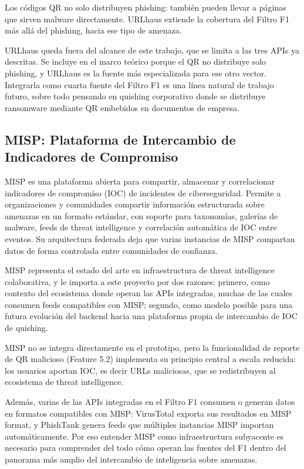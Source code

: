 Los c\'odigos QR no solo distribuyen phishing: tambi\'en pueden llevar a p\'aginas que sirven malware directamente. URLhaus extiende la cobertura del Filtro F1 m\'as all\'a del phishing, hacia ese tipo de amenaza.

URLhaus queda fuera del alcance de este trabajo, que se limita a las tres APIs ya descritas. Se incluye en el marco te\'orico porque el QR no distribuye solo phishing, y URLhaus es la fuente m\'as especializada para ese otro vector. Integrarla como cuarta fuente del Filtro F1 es una l\'inea natural de trabajo futuro, sobre todo pensando en quishing corporativo donde se distribuye ransomware mediante QR embebidos en documentos de empresa.

\subsection{MISP: Plataforma de Intercambio de Indicadores de Compromiso}

MISP \cite{misp_project} es una plataforma abierta para compartir, almacenar y correlacionar indicadores de compromiso (IOC) de incidentes de ciberseguridad. Permite a organizaciones y comunidades compartir informaci\'on estructurada sobre amenazas en un formato est\'andar, con soporte para taxonom\'ias, galer\'ias de malware, feeds de threat intelligence y correlaci\'on autom\'atica de IOC entre eventos. Su arquitectura federada deja que varias instancias de MISP compartan datos de forma controlada entre comunidades de confianza.

MISP representa el estado del arte en infraestructura de threat intelligence colaborativa, y le importa a este proyecto por dos razones: primero, como contexto del ecosistema donde operan las APIs integradas, muchas de las cuales consumen feeds compatibles con MISP; segundo, como modelo posible para una futura evoluci\'on del backend hacia una plataforma propia de intercambio de IOC de quishing.

MISP no se integra directamente en el prototipo, pero la funcionalidad de reporte de QR malicioso (Feature 5.2) implementa su principio central a escala reducida: los usuarios aportan IOC, es decir URLs maliciosas, que se redistribuyen al ecosistema de threat intelligence.

Adem\'as, varias de las APIs integradas en el Filtro F1 consumen o generan datos en formatos compatibles con MISP: VirusTotal exporta sus resultados en MISP format, y PhishTank genera feeds que m\'ultiples instancias MISP importan autom\'aticamente. Por eso entender MISP como infraestructura subyacente es necesario para comprender del todo c\'omo operan las fuentes del F1 dentro del panorama m\'as amplio del intercambio de inteligencia sobre amenazas.

